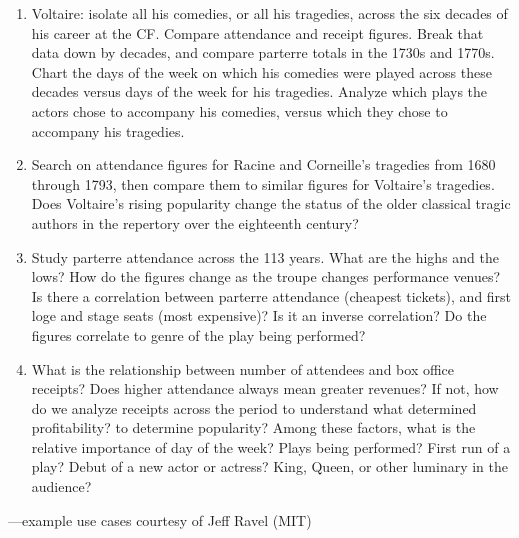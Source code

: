 \documentclass[	DIV=calc,%
							paper=a4,%
							fontsize=11pt,%
							twocolumn]{scrartcl}	 					%
\begin{document}
\begin{framefloat}
  \fontsize{9pt}{9pt}\selectfont
	\begin{enumerate}[align=left]
	  \item Voltaire: isolate all his comedies, or all his tragedies, across the six decades of his career at the CF. Compare attendance and receipt figures. Break that data down by decades, and compare parterre totals in the 1730s and 1770s. Chart the days of the week on which his comedies were played across these decades versus days of the week for his tragedies. Analyze which plays the actors chose to accompany his comedies, versus which they chose to accompany his tragedies.

		\item Search on attendance figures for Racine and Corneille's tragedies from 1680 through 1793, then compare them to similar figures for Voltaire's tragedies. Does Voltaire's rising popularity change the status of the older classical tragic authors in the repertory over the eighteenth century?

	  \item Study parterre attendance across the 113 years. What are the highs and the lows? How do the figures change as the troupe changes performance venues? Is there a correlation between parterre attendance (cheapest tickets), and first loge and stage seats (most expensive)? Is it an inverse correlation? Do the figures correlate to genre of the play being performed?

	  \item What is the relationship between number of attendees and box office receipts? Does higher attendance always mean greater revenues? If not, how do we analyze receipts across the period to understand what determined profitability? to determine popularity? Among these factors, what is the relative importance of day of the week? Plays being performed? First run of a play? Debut of a new actor or actress? King, Queen, or other luminary in the audience?
  \end{enumerate}
  \hfill —example use cases courtesy of Jeff Ravel (MIT)
\end{framefloat}
\end{document}
